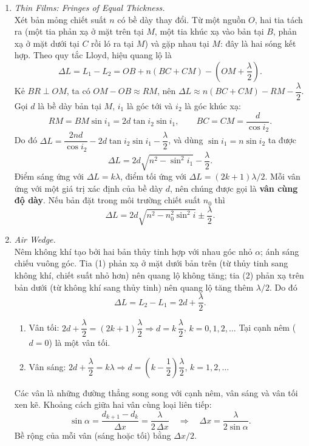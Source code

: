 \begin{enumerate}
\item \textit{Thin Films: Fringes of Equal Thickness.}\\
Xét bản mỏng chiết suất $n$ có bề dày thay đổi. Từ một nguồn $O$, hai tia tách ra (một tia phản xạ ở mặt trên tại $M$, một tia khúc xạ vào bản tại $B$, phản xạ ở mặt dưới tại $C$ rồi ló ra tại $M$) và gặp nhau tại $M$: đây là hai sóng kết hợp.
Theo quy tắc Lloyd, hiệu quang lộ là
\[
\Delta L = L_1 - L_2 = OB + n(BC + CM) - \left(OM + \frac{\lambda}{2}\right).
\]
Kẻ $BR \perp OM$, ta có $OM - OB \approx RM$, nên $\Delta L \approx n(BC + CM) - RM - \dfrac{\lambda}{2}$. Gọi $d$ là bề dày bản tại $M$, $i_1$ là góc tới và $i_2$ là góc khúc xạ:
\[
RM = BM\sin i_1 = 2d\tan i_2\sin i_1,
\qquad
BC = CM = \frac{d}{\cos i_2}.
\]
Do đó $\Delta L = \dfrac{2nd}{\cos i_2} - 2d\tan i_2\sin i_1 - \dfrac{\lambda}{2}$, và dùng $\sin i_1 = n\sin i_2$ ta được
\[
\boxed{\Delta L = 2d\sqrt{n^2 - \sin^2 i_1} - \frac{\lambda}{2}}.
\]
Điểm sáng ứng với $\Delta L = k\lambda$, điểm tối ứng với $\Delta L = (2k+1)\lambda/2$. Mỗi vân ứng với một giá trị xác định của bề dày $d$, nên chúng được gọi là \textbf{vân cùng độ dày}. Nếu bản đặt trong môi trường chiết suất $n_0$ thì
\[
\Delta L = 2d\sqrt{n^2 - n_0^2\sin^2 i} \pm \frac{\lambda}{2}.
\]

\item \textit{Air Wedge.}\\
Nêm không khí tạo bởi hai bản thủy tinh hợp với nhau góc nhỏ $\alpha$; ánh sáng chiếu vuông góc.
Tia (1) phản xạ ở mặt dưới bản trên (từ thủy tinh sang không khí, chiết suất nhỏ hơn) nên quang lộ không tăng; tia (2) phản xạ trên bản dưới (từ không khí sang thủy tinh) nên quang lộ tăng thêm $\lambda/2$. Do đó
\[
\Delta L = L_2 - L_1 = 2d + \frac{\lambda}{2}.
\]
\begin{enumerate}
  \item[(a)] Vân tối: $2d + \dfrac{\lambda}{2} = (2k+1)\dfrac{\lambda}{2} \Rightarrow d = k\,\dfrac{\lambda}{2}$, $k = 0, 1, 2, \dots$ Tại cạnh nêm ($d = 0$) là một vân tối.
  \item[(b)] Vân sáng: $2d + \dfrac{\lambda}{2} = k\lambda \Rightarrow d = \left(k - \dfrac12\right)\dfrac{\lambda}{2}$, $k = 1, 2, \dots$
\end{enumerate}
Các vân là những đường thẳng song song với cạnh nêm, vân sáng và vân tối xen kẽ. Khoảng cách giữa hai vân cùng loại liên tiếp:
\[
\sin\alpha = \frac{d_{k+1} - d_k}{\Delta x} = \frac{\lambda}{2\,\Delta x}
\quad\Rightarrow\quad
\boxed{\Delta x = \frac{\lambda}{2\sin\alpha}}.
\]
Bề rộng của mỗi vân (sáng hoặc tối) bằng $\Delta x/2$.


\end{enumerate}
